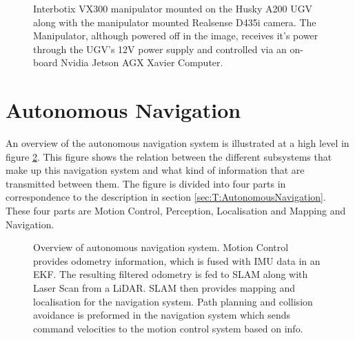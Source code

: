 \begin{figure}[H]
\begin{minipage}[b]{0.49\textwidth}
  \end{minipage}
  \caption{Interbotix VX300 manipulator mounted on the Husky A200 UGV along with the manipulator mounted Realsense D435i camera. The Manipulator, although powered off in the image, receives it's power through the UGV's 12V power supply and controlled via an on-board Nvidia Jetson AGX Xavier Computer.}
  \label{fig:M:H:M:M:MMC:Vx300Complete}
\end{figure}




\section{Autonomous Navigation} \label{sec:M:AutonomousNavigation}
An overview of the autonomous navigation system is illustrated at a high level in figure \ref{fig:M:AN:ANMethod}. This figure shows the relation between the different subsystems that make up this navigation system and what kind of information that are transmitted between them. The figure is divided into four parts in correspondence to the description in section \ref{sec:T:AutonomousNavigation}. These four parts are Motion Control, Perception, Localisation and Mapping and Navigation. 

\begin{figure}[htp]
    \fontsize{7}{14}\selectfont
    \centering
    
    \caption{Overview of autonomous navigation system. Motion Control provides odometry information, which is fused with IMU data in an EKF. The resulting filtered odometry is fed to SLAM along with Laser Scan from a LiDAR. SLAM then provides mapping and localisation for the navigation system. Path planning and collision avoidance is preformed in the navigation system which sends command velocities to the motion control system based on info.}
    \label{fig:M:AN:ANMethod}
\end{figure}

